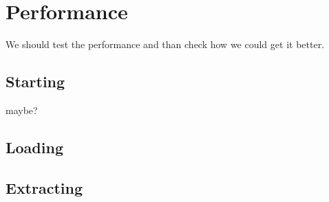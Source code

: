 \section{Performance}
We should test the performance and than check how we could get it better.

\subsection{Starting}
maybe?

\subsection{Loading}

\subsection{Extracting}
